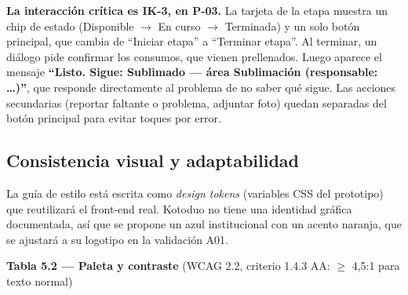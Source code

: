 \documentclass[11pt,a4paper]{article}
\begin{document}
\textbf{La interacción crítica es IK-3, en P-03.} La tarjeta de la etapa muestra un chip de estado (Disponible \ensuremath{\rightarrow}\allowbreak{} En curso \ensuremath{\rightarrow}\allowbreak{} Terminada) y un solo botón principal, que cambia de ``Iniciar etapa'' a ``Terminar etapa''. Al terminar, un diálogo pide confirmar los consumos, que vienen prellenados. Luego aparece el mensaje \textbf{``Listo. Sigue: Sublimado --- área Sublimación (responsable: \ldots{})''}, que responde directamente al problema de no saber qué sigue. Las acciones secundarias (reportar faltante o problema, adjuntar foto) quedan separadas del botón principal para evitar toques por error.

\subsection{Consistencia visual y adaptabilidad}

La guía de estilo está escrita como \textit{design tokens} (variables CSS del prototipo) que reutilizará el front-end real. Kotoduo no tiene una identidad gráfica documentada, así que se propone un azul institucional con un acento naranja, que se ajustará a su logotipo en la validación A01.

\textbf{Tabla 5.2 --- Paleta y contraste} (WCAG 2.2, criterio 1.4.3 AA: \ensuremath{\geq} 4,5:1 para texto normal)\nopagebreak
\end{document}
